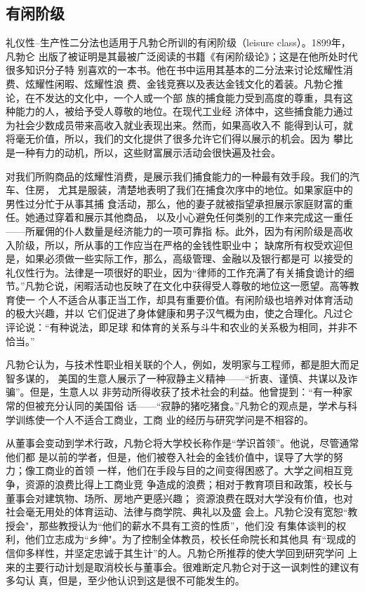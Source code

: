 \subsection{有闲阶级}

礼仪性--生产性二分法也适用于凡勃仑所训的有闲阶级（leisure class）。1899年，凡勃仑
出版了被证明是其最被广泛阅读的书籍《有闲阶级论》；这是在他所处时代很多知识分子特
别喜欢的一本书。他在书中运用其基本的二分法来讨论炫耀性消费、炫耀性闲暇、炫耀性浪
费、金钱竞赛以及表达金钱文化的着装。凡勃仑推论，在不发达的文化中，一个人或一个部
族的捕食能力受到高度的尊重，具有这种能力的人，被给予受人尊敬的地位。在现代工业经
济体中，这些捕食能力通过为社会少数成员带来高收入就业表现出来。然而，如果高收入不
能得到认可，就将毫无价值，所以，我们的文化提供了很多允许它们得以展示的机会。因为
攀比是一种有力的动机，所以，这些财富展示活动会很快遍及社会。

对我们所购商品的炫耀性消费，是展示我们捕食能力的一种最有效手段。我们的汽车、住房，
尤其是服装，清楚地表明了我们在捕食次序中的地位。如果家庭中的男性过分忙于从事其捕
食活动，那么，他的妻子就被指望承担展示家庭财富的重任。她通过穿着和展示其他商品，
以及小心避免任何类别的工作来完成这一重任——所雇佣的仆人数量是经济能力的一项可靠指
标。此外，因为有闲阶级是高收入阶级，所以，所从事的工作应当在严格的金钱性职业中；
缺席所有权受欢迎但是，如果必须做一些实际工作，那么，高级管理、金融以及银行都是可
以接受的礼仪性行为。法律是一项很好的职业，因为“律师的工作充满了有关捕食诡计的细
节。”凡勃仑说，闲暇活动也反映了在文化中获得受人尊敬的地位这一愿望。高等教育使一
个人不适合从事正当工作，却具有重要价值。有闲阶级也培养对体育活动的极大兴趣，并以
它们促进了身体健康和男子汉气概为由，使之合理化。凡过仑评论说：“有种说法，即足球
和体育的关系与斗牛和农业的关系极为相同，并非不恰当。”

凡勃仑认为，与技术性职业相关联的个人，例如，发明家与工程师，都是胆大而足智多谋的，
美国的生意人展示了一种寂静主义精神——“折衷、谨慎、共谋以及诈骗”。但是，生意人以
非劳动所得收获了技术社会的利益。他曾提到：“有一种家常的但被充分认同的美国俗
话——“寂静的猪吃猪食。”凡勃仑的观点是，学术与科学训练使一个人不适合工商业，工商
业的经历与研究学问是不相容的。

从董事会变动到学术行政，凡勃仑将大学校长称作是“学识首领”。他说，尽管通常他们都
是以前的学者，但是，他们被卷入社会的金钱价值中，误导了大学的努力；像工商业的首领
一样，他们在手段与目的之间变得困惑了。大学之间相互竞争，资源的浪费比得上工商业竞
争造成的浪费；相对于教育项目和政策，校长与董事会对建筑物、场所、房地产更感兴趣；
资源浪费在既对大学没有价值，也对社会毫无用处的体育运动、法律与商学院、典礼以及盛
会上。凡勃仑没有宽恕“教授会"，那些教授认为“他们的薪水不具有工资的性质”，他们没
有集体谈判的权利，他们立志成为“乡绅"。为了控制全体教员，校长任命院长和其他具
有“现成的信仰多样性，并坚定忠诚于其生计”的人。凡勃仑所推荐的使大学回到研究学问
上来的主要行动计划是取消校长与董事会。很难断定凡勃仑对于这一讽刺性的建议有多勾认
真，但是，至少他认识到这是很不可能发生的。

